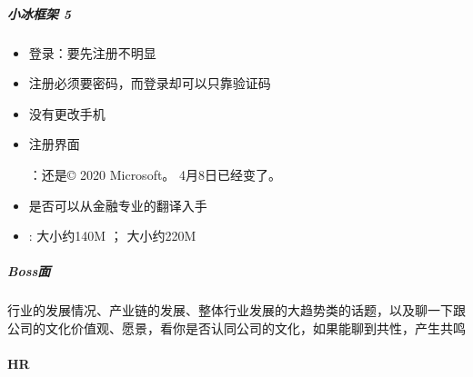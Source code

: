 \documentclass[letterpaper,10pt,english]{sphinxmanual}
\begin{document}
\subparagraph{小冰框架 5\sphinxfootnotemark[883]}
\label{\detokenize{chapter_interview/simulate_interview:id12}}%
\begin{footnotetext}[883]\sphinxAtStartFootnote
{}
%
\end{footnotetext}\ignorespaces \begin{itemize}
\item {} 
登录：要先注册不明显

\item {} 
注册必须要密码，而登录却可以只靠验证码

\item {} 
没有更改手机

\item {} 
注册界面
%
\begin{footnote}[884]\sphinxAtStartFootnote
{}
%
\end{footnote}：还是© 2020
Microsoft。 4月8日已经变了。

\item {} 
是否可以从金融专业的翻译入手%
\begin{footnote}[885]\sphinxAtStartFootnote
{}
%
\end{footnote}

\item {} 
: 大小约140M ； 
大小约220M

\end{itemize}


\subparagraph{Boss面}
\label{\detokenize{chapter_interview/simulate_interview:boss}}
行业的发展情况、产业链的发展、整体行业发展的大趋势类的话题，以及聊一下跟公司的文化价值观、愿景，看你是否认同公司的文化，如果能聊到共性，产生共鸣%
\begin{footnote}[886]\sphinxAtStartFootnote
{}
%
\end{footnote}


\paragraph{HR}
\label{\detokenize{chapter_interview/HR:hr}}\label{\detokenize{chapter_interview/HR::doc}}
\end{document}
